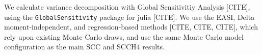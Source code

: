 We calculate variance decomposition with Global Sensitivitiy Analysis
[CITE], using the {\tt GlobalSensitivity} package for julia [CITE]. We
use the EASI, Delta moment-independent, and regression-based methods
[CITE, CITE, CITE], which rely upon existing Monte Carlo draws, and
use the same Monte Carlo model configuration as the main SCC and SCCH4
results.



